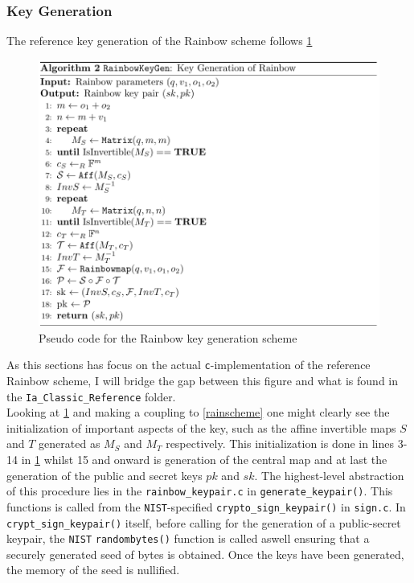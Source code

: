 \subsubsection{Key Generation}
The reference key generation of the Rainbow scheme follows \cref{rainbowkeygen}
\begin{figure}[h]
    \centering
    \includegraphics[width=\textwidth]{resources/rainbowkeygen.png}
    \caption{Pseudo code for the Rainbow key generation scheme}
    \label{rainbowkeygen}
\end{figure}
As this sections has focus on the actual \texttt{c}-implementation of the reference Rainbow scheme, I will bridge the gap between this figure and what is found in the \texttt{Ia\_Classic\_Reference} folder.\medskip\\
Looking at \cref{rainbowkeygen} and making a coupling to \cref{rainscheme} one might clearly see the initialization of important aspects of the key, such as the affine invertible maps $S$ and $T$ generated as $M_S$ and $M_T$ respectively. This initialization is done in lines 3-14 in \cref{rainbowkeygen} whilst 15 and onward is generation of the central map and at last the generation of the public and secret keys $pk$ and $sk$. The highest-level abstraction of this procedure lies in the \texttt{rainbow\_keypair.c} in \texttt{generate\_keypair()}. This functions is called from the \texttt{NIST}-specified \texttt{crypto\_sign\_keypair()} in \texttt{sign.c}. In \texttt{crypt\_sign\_keypair()} itself, before calling for the generation of a public-secret keypair, the \texttt{NIST} \texttt{randombytes()} function is called aswell ensuring that a securely generated seed of bytes is obtained. Once the keys have been generated, the memory of the seed is nullified.\medskip\\
